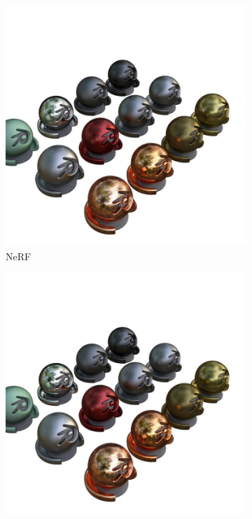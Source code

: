 \documentclass[12pt, a4paper, twoside]{book}
\numberwithin{equation}{chapter}
\numberwithin{theorem}{section}
\numberwithin{definition}{section}
\numberwithin{definitionChapter}{chapter}
\begin{document}
	\begin{figure}[H]
		\centering
		\begin{subfigure}{0.3\textwidth}
			\centering
			\includegraphics[scale=0.2]{img/nerf/nerf_materials_36.jpg}
			\caption{NeRF}
		\end{subfigure}
		\hspace*{\fill}
		\begin{subfigure}{0.3\textwidth}
			\centering
			\includegraphics[scale=0.2]{img/mipnerf/mipnerf_materials_36.jpg}

\end{subfigure}
\end{figure}
\end{document}

